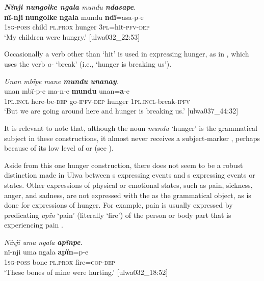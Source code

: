 \ea%
    \label{ex:clause:91}
          \textit{\textbf{Nïnji nungolke ngala} mundu \textbf{ndasape}}.\\
\gll \textbf{nï-nji}    \textbf{nungolke}  \textbf{ngala}    mundu  \textbf{ndï}=asa-p-e\\
    1\textsc{sg}{}-\textsc{poss}  child    \textsc{pl.prox}  hunger  \textsc{3pl}=hit-\textsc{pfv}{}-\textsc{dep}\\
\glt `My children were hungry.’ [ulwa032\_22:53]
\z

Occasionally a verb other than ‘hit’ is used in expressing hunger, as in , which uses the verb \textit{a-} ‘break’ (i.e., ‘hunger is breaking us’).

\ea%
    \label{ex:clause:92}
          \textit{Unan mbïpe mane \textbf{mundu} \textbf{unanay}.}\\
\gll unan    mbï-p-e    ma-n-e      \textbf{mundu}  unan=\textbf{a}{}-e\\
    1\textsc{pl.incl}  here-be-\textsc{dep}  go-\textsc{ipfv}{}-\textsc{dep}  hunger  1\textsc{pl.incl}{}-break-\textsc{ipfv}\\
\glt `But we are going around here and hunger is breaking us.’ [ulwa037\_44:32]
\z

It is relevant to note that, although the noun \textit{mundu} ‘hunger’ is the grammatical subject in these constructions, it almost never receives a  subject-marker , perhaps because of its low level of  or  (see ).

  Aside from this one hunger construction, there does not seem to be a robust  distinction made in Ulwa between s expressing  events and s expressing  events or states. Other expressions of physical or emotional states, such as pain, sickness, anger, and sadness, are not expressed with the  as the grammatical object, as is done for expressions of hunger. For example, pain is usually expressed by predicating \textit{apïn} ‘pain’ (literally ‘fire’) of the person or body part that is experiencing pain .

\ea%
    \label{ex:clause:93}
          \textit{Nïnji uma ngala} \textbf{\textit{apïnpe}}.\\
\gll nï-nji    uma  ngala    \textbf{apïn}=p-e\\
    \textsc{1sg-poss}  bone  \textsc{pl.prox}  fire=\textsc{cop}{}-\textsc{dep}\\
\glt `These bones of mine were hurting.’ [ulwa032\_18:52]
\z


